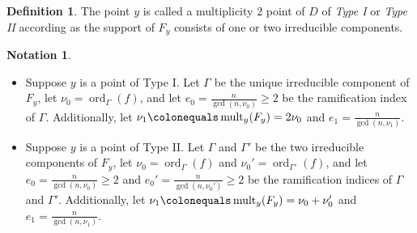 \documentclass[12pt]{amsart}
\numberwithin{equation}{section}
\theoremstyle{definition}
\newtheorem{notation}[equation]{Notation}
\newtheorem{defn}[equation]{Definition}
\DeclareMathOperator{\mult}{mult}
\DeclareMathOperator{\ord}{ord}
\begin{document}
\begin{defn}
 The point $y$ is called a multiplicity $2$ point of $D$ of \textit{Type I} or \textit{Type II} according as the support of $F_y$ consists of one or two irreducible components.
\end{defn}

\begin{notation}\label{notation: initial parameters}\hfill
\begin{itemize}
    \item Suppose $y$ is a point of Type I. Let $\Gamma$ be the unique irreducible component of $F_y$, let $\nu_0=\ord_\Gamma(f)$, and let $e_0=\frac{n}{\gcd(n,\nu_0)}\geq 2$ be the ramification index of $\Gamma$. Additionally, let $\nu_1\colonequals\mult_y(F_y)=2\nu_0$ and $e_1=\frac{n}{\gcd(n,\nu_1)}$.

    \item Suppose $y$ is a point of Type II. Let $\Gamma$ and $\Gamma'$ be the two irreducible components of $F_y$, let $\nu_0=\ord_\Gamma(f)$ and $\nu_0'=\ord_{\Gamma'}(f)$, and let $e_0=\frac{n}{\gcd(n,\nu_0)}\geq 2$ and $e_0'=\frac{n}{\gcd(n,\nu_0')}\geq 2$ be the ramification indices of $\Gamma$ and $\Gamma'$. Additionally, let $\nu_1\colonequals\mult_y(F_y)=\nu_0+\nu_0'$ and $e_1=\frac{n}{\gcd(n,\nu_1)}$.
\end{itemize}
\end{notation}
\end{document}
